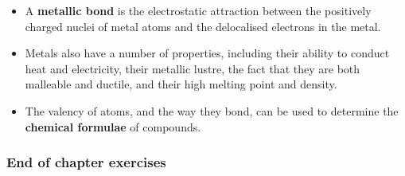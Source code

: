 \begin{itemize}[noitemsep]
\label{m38689*uid153}\item A \textbf{metallic bond} is the electrostatic attraction between the positively charged nuclei of metal atoms and the delocalised electrons in the metal.
\label{m38689*uid154}\item Metals also have a number of properties, including their ability to conduct heat and electricity, their metallic lustre, the fact that they are both malleable and ductile, and their high melting point and density.
\label{m38689*uid155}\item The valency of atoms, and the way they bond, can be used to determine the \textbf{chemical formulae} of compounds.
\end{itemize}
        
\label{m38689*secfhsst!!!underscore!!!id1181}
            \subsubsection{ End of chapter exercises }
            \nopagebreak
            
